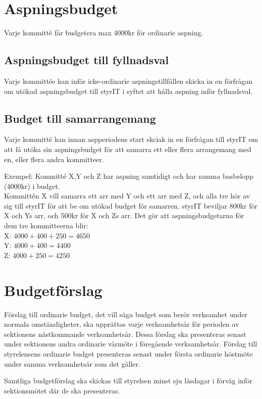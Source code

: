 \documentclass[11pt, includeaddress]{classes/cthit}
\begin{document}
\section{Aspningsbudget}

Varje kommitté får budgetera max 4000kr för ordinarie aspning.

\subsection{Aspningsbudget till fyllnadsval}
Varje kommittée kan inför icke-ordinarie aspningstillfällen skicka in en förfrågan om utökad aspningsbudget till styrIT i syftet att hålla aspning inför fyllnadsval.

\subsection{Budget till samarrangemang}
Varje kommitté kan innan aspperiodens start skciak in en förfrågan till styrIT om att få utöka sin aspningsbudget för att samarra ett eller flera arrangemang med en, eller flera andra kommitteer.

Exempel: Kommitté X,Y och Z har aspning samtidigt och har samma basbelopp (4000kr) i budget.\\
Kommittén X vill samarra ett arr med Y och ett arr med Z, och alla tre hör av sig till styrIT för att be om utökad budget för samarren.
styrIT beviljar 800kr för X och Ys arr, och 500kr för X och Zs arr. Det gör att aspningsbudgetarna för dem tre kommitteerna blir:\\
X: $4000+400+250=4650$\\
Y: $4000+400=4400$\\
Z: $4000+250=4250$

\section{Budgetförslag}
Förslag till ordinarie budget, det vill säga budget som berör verksamhet under normala omständigheter, ska upprättas varje verksamhetsår för perioden av sektionens nästkommande verksamhetsår. Dessa förslag ska presenteras senast under sektionens andra ordinarie vårmöte i föregående verksamhetsår. Förslag till styrelensens ordinarie budget presenteras senast under första ordinarie höstmöte under samma verksamhetsår som det gäller.

Samtliga budgetförslag ska skickas till styrelsen minst sju läsdagar i förväg inför sektionsmötet där de ska presenteras.
\end{document}
